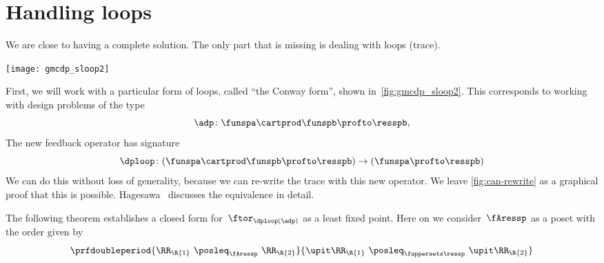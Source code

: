 \section{Handling loops}

We are close to having a complete solution.
The only part that is missing is dealing with loops (trace).

\begin{marginfigure}
    \texttt{[image: gmcdp\_sloop2]}
    \caption{}
    \label{fig:gmcdp_sloop2}
\end{marginfigure}

First, we will work with a particular form of loops, called ``the Conway form'',
shown in~\cref{fig:gmcdp_sloop2}.
This corresponds to working with design problems of the type
\begin{equation*}
    \adp \colon \funspa \cartprod \funspb  \profto \resspb,
\end{equation*}
The new feedback operator has signature
\begin{equation*}
    \dploop\colon (\funspa \cartprod \funspb \profto \resspb) \to (\funspa \profto \resspb)
\end{equation*}
%
We can do this without loss of generality, because we can re-write the trace
with this new operator.
We leave \cref{fig:can-rewrite} as a graphical proof that this is possible.
Hagesawa~\cite{hasegawa02uniformity} discusses the equivalence in detail.

\begin{figure*}[h]
    \hspace*{\fill}
    \hspace*{\fill}
    \hspace*{\fill}
    \caption{We can rewrite the trace in Conway's form.}
    \label{fig:can-rewrite}
\end{figure*}

The following theorem establishes a closed form for~$\ftor_{\dploop(\adp)}$ as a least fixed point.
Here on we consider~$\fAressp$ as a poset with the order given by
\begin{equation}
    \prfdoubleperiod{
        \RR_\R{1} \  \posleq_{\fAressp} \ \RR_\R{2}
    }{
        \upit \RR_\R{1} \ \posleq_{\fuppersets \ressp}\  \upit \RR_\R{2}
    }
\end{equation}


